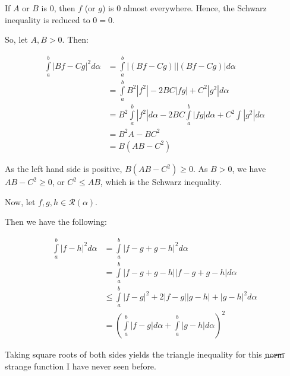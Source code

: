 \documentclass[a4paper,12pt]{article}
\newcommand{\tab}{\hspace{4mm}} %
\newcommand{\shunt}{\vspace{20mm}}
\newcommand{\absval}[1]{\left\lvert #1 \right\rvert}
\newcommand{\al}{\alpha} %
\newcommand{\scrR}{\mathcal{R}}
\begin{document}
\tab If $A$ or $B$ is $0$, then $f$ (or $g$) is $0$ almost everywhere. Hence, the Schwarz inequality is reduced to $0=0$.

\tab So, let $A, B >0$. Then:

\begin{align*}
\int\limits_a^b \absval{Bf-Cg}^2 d\al &= \int\limits_a^b \absval{(Bf-Cg)}\absval{(Bf-Cg)} d\al \\
&= \int\limits_a^b B^2\absval{f^2}-2BC\absval{fg} +C^2\absval{g^2} d\al \\
&= B^2 \int\limits_a^b \absval{f^2} d\al -2BC \int\limits_a^b \absval{fg} d\al + C^2 \int\limits \absval{g^2} d\al \\
&= B^2A-BC^2 \\
&= B(AB-C^2)
\end{align*}

\tab As the left hand side is positive, $B(AB-C^2) \geq 0$. As $B >0$, we have $AB - C^2 \geq 0$, or $C^2 \leq AB$, which is the Schwarz inequality.

Now, let $f,g,h \in \scrR(\al)$.

Then we have the following:

\begin{align*}
\int\limits_a^b \absval{f-h}^2 d\al &= \int\limits_a^b \absval{f-g+g-h}^2 d\al \\
&= \int\limits_a^b \absval{f-g+g-h}\absval{f-g+g-h} d\al \\
&\leq \int\limits_a^b \absval{f-g}^2 +2\absval{f-g}\absval{g-h} + \absval{g-h}^2 d\al \\
&= \left(\int\limits_a^b \absval{f-g} d\al + \int\limits_a^b \absval{g-h} d\al\right)^2
\end{align*}

Taking square roots of both sides yields the triangle inequality for this $\cancel{\text{norm}}$ strange function I have never seen before.

\shunt
\end{document}
